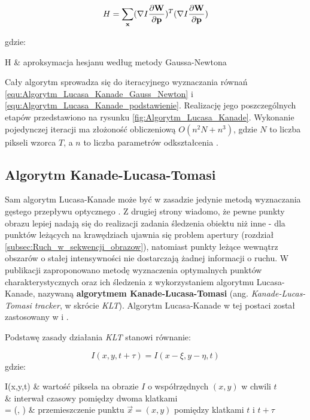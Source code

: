 \begin{equation}
\label{equ:Algorytm_Lucasa_Kanade_hesjan}
	H = \sum\limits_{\mathbf{x}}(\nabla I \frac{\partial \mathbf{W}}{\partial \mathbf{p}})^T (\nabla I \frac{\partial \mathbf{W}}{\partial \mathbf{p}})
\end{equation}

\noindent
gdzie:
\begin{conditions}
	H & aproksymacja hesjanu według metody Gaussa-Newtona \\
\end{conditions}

Cały algorytm sprowadza się do iteracyjnego wyznaczania równań \ref{equ:Algorytm_Lucasa_Kanade_Gauss_Newton} i \ref{equ:Algorytm_Lucasa_Kanade_podstawienie}. Realizację jego poszczególnych etapów przedstawiono na rysunku \ref{fig:Algorytm_Lucasa_Kanade}. Wykonanie pojedynczej iteracji ma złożoność obliczeniową $O(n^2 N + n^3)$, gdzie $N$ to liczba pikseli wzorca $T$, a $n$ to liczba parametrów odkształcenia \cite{Baker2004}.

\subsection{Algorytm Kanade-Lucasa-Tomasi}
\label{subsec:Algorytm_Kanade_Lucasa_Tomasi}

Sam algorytm Lucasa-Kanade może być w zasadzie jedynie metodą wyznaczania gęstego przepływu optycznego \cite{Yilmaz2006}. Z drugiej strony wiadomo, że pewne punkty obrazu lepiej nadają się do realizacji zadania śledzenia obiektu niż inne \cite{Tomasi1991} - dla punktów leżących na krawędziach ujawnia się problem apertury (rozdział \ref{subsec:Ruch_w_sekwencji_obrazow}), natomiast punkty leżące wewnątrz obszarów o stałej intensywności nie dostarczają żadnej informacji o ruchu. W publikacji \cite{Tomasi1991} zaproponowano metodę wyznaczenia optymalnych punktów charakterystycznych oraz ich śledzenia z wykorzystaniem algorytmu Lucasa-Kanade, nazywaną \textbf{algorytmem Kanade-Lucasa-Tomasi} (ang. \textit{Kanade-Lucas-Tomasi tracker}, w skrócie \textit{KLT}). Algorytm Lucasa-Kanade w tej postaci został zastosowany w \cite{Liem2008} i \cite{Sadeghi-Tehran2014}.

Podstawę zasady działania \textit{KLT} stanowi równanie:

\begin{equation}
\label{equ:Algorytm_Lucasa_Kanade_Tomasi_podstawowe_rówanie}
	I(x, y, t + \tau) = I(x - \xi, y - \eta, t)
\end{equation}
\noindent
gdzie:
\begin{conditions}
	I(x,y,t) & wartość piksela na obrazie $I$ o współrzędnych $(x,y)$ w chwili $t$ \\
	\tau & interwał czasowy pomiędzy dwoma klatkami \\
	 = (\xi, \eta) & przemieszczenie punktu $\vec{x} = (x, y)$ pomiędzy klatkami $t$ i $t + \tau$ \\
\end{conditions}

